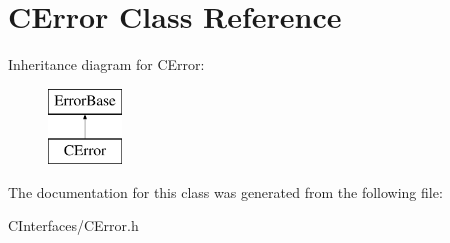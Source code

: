 \hypertarget{classCError}{
\section{CError Class Reference}
\label{classCError}
}
Inheritance diagram for CError:\begin{figure}[H]
\begin{center}
\leavevmode
\includegraphics[height=2.000000cm]{classCError}
\end{center}
\end{figure}


The documentation for this class was generated from the following file:\begin{DoxyCompactItemize}
\item 
CInterfaces/CError.h\end{DoxyCompactItemize}
